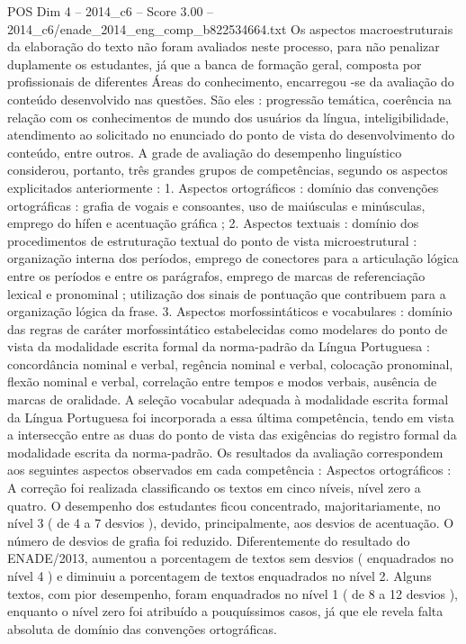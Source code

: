 \begin{textsample}{POS Dim 4 – 2014\_c6 – Score 3.00 – 2014\_c6/enade\_2014\_eng\_comp\_b822534664.txt}
Os aspectos macroestruturais da elaboração do texto não foram avaliados neste processo, para não penalizar duplamente os estudantes, já que a banca de formação geral, composta por profissionais de diferentes Áreas do conhecimento, encarregou -se da avaliação do conteúdo desenvolvido nas questões.
São eles : progressão temática, coerência na relação com os conhecimentos de mundo dos usuários da língua, inteligibilidade, atendimento ao solicitado no enunciado do ponto de vista do desenvolvimento do conteúdo, entre outros.
A grade de avaliação do desempenho linguístico considerou, portanto, três grandes grupos de competências, segundo os aspectos explicitados anteriormente : 1.
Aspectos ortográficos : domínio das convenções ortográficas : grafia de vogais e consoantes, uso de maiúsculas e minúsculas, emprego do hífen e acentuação gráfica ; 2.
Aspectos textuais : domínio dos procedimentos de estruturação textual do ponto de vista microestrutural : organização interna dos períodos, emprego de conectores para a articulação lógica entre os períodos e entre os parágrafos, emprego de marcas de referenciação lexical e pronominal ; utilização dos sinais de pontuação que contribuem para a organização lógica da frase. 3.
Aspectos morfossintáticos e vocabulares : domínio das regras de caráter morfossintático estabelecidas como modelares do ponto de vista da modalidade escrita formal da norma-padrão da Língua Portuguesa : concordância nominal e verbal, regência nominal e verbal, colocação pronominal, flexão nominal e verbal, correlação entre tempos e modos verbais, ausência de marcas de oralidade.
A seleção vocabular adequada à modalidade escrita formal da Língua Portuguesa foi incorporada a essa última competência, tendo em vista a intersecção entre as duas do ponto de vista das exigências do registro formal da modalidade escrita da norma-padrão.
Os resultados da avaliação correspondem aos seguintes aspectos observados em cada competência : Aspectos ortográficos : A correção foi realizada classificando os textos em cinco níveis, nível zero a quatro.
O desempenho dos estudantes ficou concentrado, majoritariamente, no nível 3 ( de 4 a 7 desvios ), devido, principalmente, aos desvios de acentuação.
O número de desvios de grafia foi reduzido.
Diferentemente do resultado do ENADE/2013, aumentou a porcentagem de textos sem desvios ( enquadrados no nível 4 ) e diminuiu a porcentagem de textos enquadrados no nível 2.
Alguns textos, com pior desempenho, foram enquadrados no nível 1 ( de 8 a 12 desvios ), enquanto o nível zero foi atribuído a pouquíssimos casos, já que ele revela falta absoluta de domínio das convenções ortográficas.

\end{textsample}
